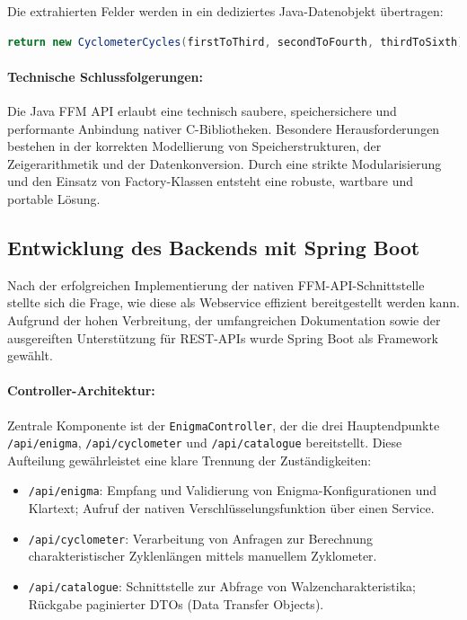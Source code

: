 \documentclass[12pt, ngerman, a4paper, numbers=noenddot]{article}
\begin{document}
Die extrahierten Felder werden in ein dediziertes Java-Datenobjekt übertragen:

\begin{lstlisting}[language=Java]
return new CyclometerCycles(firstToThird, secondToFourth, thirdToSixth);
\end{lstlisting}


\paragraph{Technische Schlussfolgerungen:}

Die Java FFM API erlaubt eine technisch saubere, speichersichere und performante Anbindung nativer C-Bibliotheken. Besondere Herausforderungen bestehen in der korrekten Modellierung von Speicherstrukturen, der Zeigerarithmetik und der Datenkonversion. Durch eine strikte Modularisierung und den Einsatz von Factory-Klassen entsteht eine robuste, wartbare und portable Lösung.




\subsection{Entwicklung des Backends mit Spring Boot}

Nach der erfolgreichen Implementierung der nativen FFM-API-Schnittstelle stellte sich die Frage, wie diese als Webservice effizient bereitgestellt werden kann. Aufgrund der hohen Verbreitung, der umfangreichen Dokumentation sowie der ausgereiften Unterstützung für REST-APIs wurde Spring Boot als Framework gewählt.

\paragraph{Controller-Architektur:}

Zentrale Komponente ist der \lstinline|EnigmaController|, der die drei Hauptendpunkte \lstinline|/api/enigma|, \lstinline|/api/cyclometer| und \lstinline|/api/catalogue| bereitstellt. Diese Aufteilung gewährleistet eine klare Trennung der Zuständigkeiten:

\begin{itemize}
	\item \lstinline|/api/enigma|: Empfang und Validierung von Enigma\hyp{}Konfigurationen und Klartext; Aufruf der nativen Verschlüsselungsfunktion über einen Service.
	\item \lstinline|/api/cyclometer|: Verarbeitung von Anfragen zur Berechnung charakteristischer Zyklenlängen mittels manuellem Zyklometer.
	\item \lstinline|/api/catalogue|: Schnittstelle zur Abfrage von Walzencharakteristika; Rückgabe paginierter DTOs (Data Transfer Objects).
\end{itemize}
\end{document}
